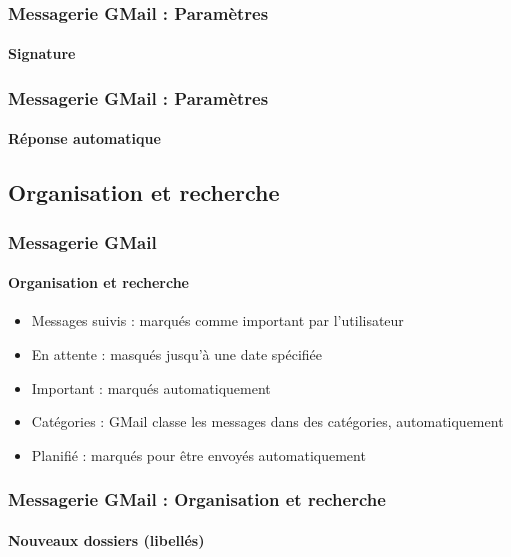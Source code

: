 \documentclass[xcolor=table]{beamer}
\begin{document}
\begin{frame}
\frametitle{Messagerie GMail : Paramètres}
\framesubtitle{Signature}

\begin{center}
\end{center}

\end{frame}

\begin{frame}
\frametitle{Messagerie GMail : Paramètres}
\framesubtitle{Réponse automatique}

\begin{center}
\end{center}

\end{frame}

\subsection{Organisation et recherche}

\begin{frame}
\frametitle{Messagerie GMail}
\framesubtitle{Organisation et recherche}

\begin{minipage}{0.69\textwidth}
	\begin{itemize}
		\item Messages suivis : marqués comme important par l'utilisateur
		\item En attente : masqués jusqu'à une date spécifiée
		\item Important : marqués automatiquement 
		\item Catégories : GMail classe les messages dans des catégories, automatiquement
		\item Planifié : marqués pour être envoyés automatiquement
	\end{itemize}
\end{minipage}
\begin{minipage}{0.26\textwidth}
\end{minipage}

\end{frame}

\begin{frame}
\frametitle{Messagerie GMail : Organisation et recherche}
\framesubtitle{Nouveaux dossiers (libellés)}


\end{frame}
\end{document}
